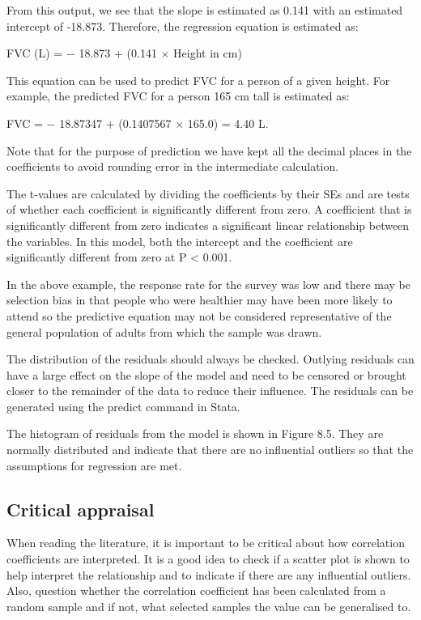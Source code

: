 \documentclass[
]{memoir}
\begin{document}
From this output, we see that the slope is estimated as 0.141 with an estimated intercept of -18.873. Therefore, the regression equation is estimated as:

FVC (L) = − 18.873 + (0.141 \(\times\) Height in cm)

This equation can be used to predict FVC for a person of a given height. For example, the predicted FVC for a person 165 cm tall is estimated as:

FVC = − 18.87347 + (0.1407567 \(\times\) 165.0) = 4.40 L.

Note that for the purpose of prediction we have kept all the decimal places in the coefficients to avoid rounding error in the intermediate calculation.

The t-values are calculated by dividing the coefficients by their SEs and are tests of whether each coefficient is significantly different from zero. A coefficient that is significantly different from zero indicates a significant linear relationship between the variables. In this model, both the intercept and the coefficient are significantly different from zero at P \textless{} 0.001.

In the above example, the response rate for the survey was low and there may be selection bias in that people who were healthier may have been more likely to attend so the predictive equation may not be considered representative of the general population of adults from which the sample was drawn.

The distribution of the residuals should always be checked. Outlying residuals can have a large effect on the slope of the model and need to be censored or brought closer to the remainder of the data to reduce their influence. The residuals can be generated using the predict command in Stata.

The histogram of residuals from the model is shown in Figure 8.5. They are normally distributed and indicate that there are no influential outliers so that the assumptions for regression are met.

\hypertarget{critical-appraisal}{%
\subsection{Critical appraisal}\label{critical-appraisal}}

When reading the literature, it is important to be critical about how correlation coefficients are interpreted. It is a good idea to check if a scatter plot is shown to help interpret the relationship and to indicate if there are any influential outliers. Also, question whether the correlation coefficient has been calculated from a random sample and if not, what selected samples the value can be generalised to.
\end{document}
